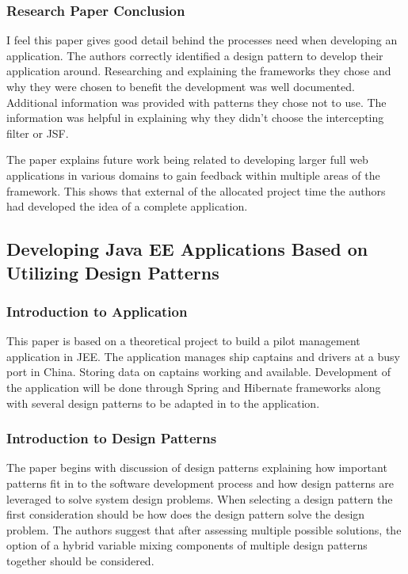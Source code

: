 									\subsubsection{Research Paper Conclusion}
									I feel this paper gives good detail behind the processes need when developing an application. The authors correctly identified a design pattern to develop their application around. Researching and explaining the frameworks they chose and why they were chosen to benefit the development was well documented. Additional information was provided with patterns they chose not to use. The information was helpful in explaining why they didn’t choose the intercepting filter or JSF.
									
									The paper explains future work being related to developing larger full web applications in various domains to gain feedback within multiple areas of the framework. This shows that external of the allocated project time the authors had developed the idea of a complete application.		
									
									\subsection{Developing Java EE Applications Based on Utilizing Design Patterns}
									
									\subsubsection{Introduction to Application}
									This paper is based on a theoretical project to build a pilot management application in JEE. The application manages ship captains and drivers at a busy port in China. Storing data on captains working and available. Development of the application will be done through Spring and Hibernate frameworks along with several design patterns to be adapted in to the application.
									
									\subsubsection{Introduction to Design Patterns}
									The paper begins with discussion of design patterns explaining how important patterns fit in to the software development process and how design patterns are leveraged to solve system design problems. When selecting a design pattern the first consideration should be how does the design pattern solve the design problem. The authors suggest that after assessing multiple possible solutions, the option of a hybrid variable mixing components of multiple design patterns together should be considered.
									
